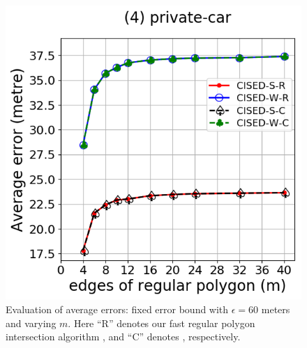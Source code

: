 {\begin{figure}[tb!]
	\includegraphics[scale = 0.2900]{Figures/Exp-M-e-60-error-private.png}
	\caption{\small Evaluation of average errors: fixed error bound with $\epsilon = 60$ meters and varying $m$.
Here ``R'' denotes our fast regular polygon intersection algorithm \rpia, and ``C'' denotes \cpia, respectively.}
	\label{fig:m-error-e60}
\end{figure}


}

